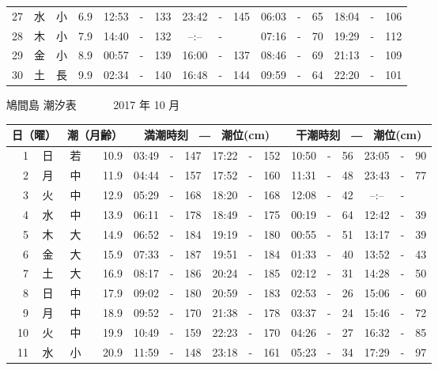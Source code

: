 \documentclass[12pt.a4j]{jsarticle}
\begin{document}
\begin{center}
\begin{table}[ht]
\begin{tabular}{|rc|cr|ccrccr|ccrccr|}
27 & 水 & 小 &  6.9 &  12:53 &-& 133  &  23:42 &-& 145  &   06:03 &-&  65  &   18:04 &-& 106  \\
28 & 木 & 小 &  7.9 &  14:40 &-& 132  &  --:-- &-&     &   07:16 &-&  70  &   19:29 &-& 112  \\
29 & 金 & 小 &  8.9 &  00:57 &-& 139  &  16:00 &-& 137  &   08:46 &-&  69  &   21:13 &-& 109  \\
30 & 土 & 長 &  9.9 &  02:34 &-& 140  &  16:48 &-& 144  &   09:59 &-&  64  &   22:20 &-& 101  \\
   \hline
   \end{tabular}
\end{table}
\newpage
 {\LARGE 鳩間島  潮汐表　　　}
 {\large 2017 年 10 月}\\
 \begin{table}[ht]
    \begin{tabular}{|rc|cr|ccrccr|ccrccr|}
    \hline
    \multicolumn{2}{|c|}{日（曜）} & \multicolumn{2}{c|}{潮（月齢）} & \multicolumn{6}{c|}{満潮時刻　―　潮位(cm)} & \multicolumn{6}{c|}{干潮時刻　―　潮位(cm)} \\
 \hline
 1 & 日 & 若 & 10.9 &  03:49 &-& 147  &  17:22 &-& 152  &   10:50 &-&  56  &   23:05 &-&  90  \\
 2 & 月 & 中 & 11.9 &  04:44 &-& 157  &  17:52 &-& 160  &   11:31 &-&  48  &   23:43 &-&  77  \\
 3 & 火 & 中 & 12.9 &  05:29 &-& 168  &  18:20 &-& 168  &   12:08 &-&  42  &   --:-- &-&     \\
 4 & 水 & 中 & 13.9 &  06:11 &-& 178  &  18:49 &-& 175  &   00:19 &-&  64  &   12:42 &-&  39  \\
 5 & 木 & 大 & 14.9 &  06:52 &-& 184  &  19:19 &-& 180  &   00:55 &-&  51  &   13:17 &-&  39  \\
 6 & 金 & 大 & 15.9 &  07:33 &-& 187  &  19:51 &-& 184  &   01:33 &-&  40  &   13:52 &-&  43  \\
 7 & 土 & 大 & 16.9 &  08:17 &-& 186  &  20:24 &-& 185  &   02:12 &-&  31  &   14:28 &-&  50  \\
 8 & 日 & 中 & 17.9 &  09:02 &-& 180  &  20:59 &-& 183  &   02:53 &-&  26  &   15:06 &-&  60  \\
 9 & 月 & 中 & 18.9 &  09:52 &-& 170  &  21:38 &-& 178  &   03:37 &-&  24  &   15:46 &-&  72  \\
10 & 火 & 中 & 19.9 &  10:49 &-& 159  &  22:23 &-& 170  &   04:26 &-&  27  &   16:32 &-&  85  \\
11 & 水 & 小 & 20.9 &  11:59 &-& 148  &  23:18 &-& 161  &   05:23 &-&  34  &   17:29 &-&  97  \\

\end{tabular}
\end{table}
\end{center}
\end{document}
